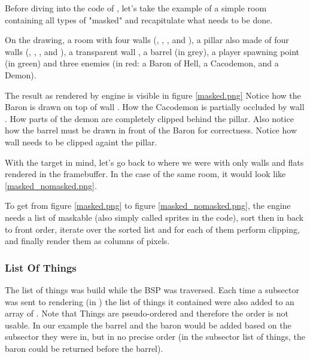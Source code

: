 Before diving into the code of , let's take the example of a simple room containing all types of "masked" and recapitulate what needs to be done.\\
\par
 On the drawing, a room with four walls (, , , and ), a pillar also made of four walls (, , , and ), a transparent wall , a barrel (in grey), a player spawning point (in green) and three enemies (in red: a Baron of Hell, a Cacodemon, and a Demon).\\
\par
The result as rendered by \doom{}engine is visible in figure \ref{masked.png} Notice how the Baron is drawn on top of wall . How the Cacodemon is partially occluded by wall . How parts of the demon are completely clipped behind the pillar. Also notice how the barrel must be drawn in front of the Baron for correctness. Notice how wall  needs to be clipped againt the pillar.\\
\par
{}
\par
With the target in mind, let's go back to where we were with only walls and flats rendered in the framebuffer. In the case of the same room, it would look like \ref{masked_nomasked.png}.\\
\par
{}
\par
To get from figure \ref{masked.png} to figure \ref{masked_nomasked.png}, the engine needs a list of maskable (also simply called sprites in the code), sort then in back to front order, iterate over the sorted list and for each of them perform clipping, and finally render them as columns of pixels.\\
\par
\subsubsection{List Of Things}
 The list of things was build while the BSP was traversed. Each time a subsector was sent to rendering (in ) the list of things it contained were also added to an array of . Note that Things are pseudo-ordered and therefore the order is not usable. In our example the barrel and the baron would be added based on the subsector they were in, but in no precise order (in the subsector list of things, the baron could be returned before the barrel).\\
 \par
